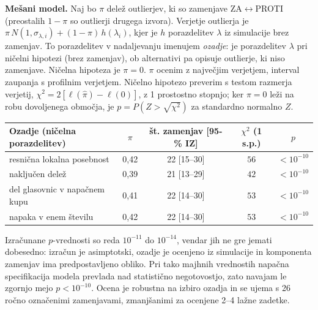 \documentclass[11pt,a4paper]{article}
\begin{document}
\textbf{Mešani model.} Naj bo $\pi$ delež outlierjev, ki so zamenjave ZA$\leftrightarrow$PROTI (preostalih $1-\pi$ so outlierji drugega izvora). Verjetje outlierja je $\pi\,N(1,\sigma_{\lambda,i}) + (1-\pi)\,h(\lambda_i)$, kjer je $h$ porazdelitev $\lambda$ iz simulacije brez zamenjav. To porazdelitev v nadaljevanju imenujem \emph{ozadje}: je porazdelitev $\lambda$ pri ničelni hipotezi (brez zamenjav), ob alternativi pa opisuje outlierje, ki niso zamenjave. Ničelna hipoteza je $\pi=0$. $\pi$ ocenim z največjim verjetjem, interval zaupanja s profilnim verjetjem. Ničelno hipotezo preverim s testom razmerja verjetij, $\chi^2=2[\ell(\hat\pi)-\ell(0)]$, z 1 prostostno stopnjo; ker $\pi=0$ leži na robu dovoljenega območja, je $p=P(Z>\sqrt{\chi^2})$ za standardno normalno $Z$.

\begin{center}
\begin{tabular}{lcccc}
\toprule
Ozadje (ničelna porazdelitev) & $\pi$ & št. zamenjav [95-\% IZ] & $\chi^2$ (1 s.p.) & $p$ \\
\midrule
resnična lokalna posebnost & 0,42 & 22 [15--30] & $56$ & $<10^{-10}$ \\
naključen delež & 0,39 & 21 [13--29] & $42$ & $<10^{-10}$ \\
del glasovnic v napačnem kupu & 0,41 & 22 [14--30] & $53$ & $<10^{-10}$ \\
napaka v enem številu & 0,42 & 22 [14--30] & $53$ & $<10^{-10}$ \\
\bottomrule
\end{tabular}
\end{center}

Izračunane $p$-vrednosti so reda $10^{-11}$ do $10^{-14}$, vendar jih ne gre jemati dobesedno: izračun je asimptotski, ozadje je ocenjeno iz simulacije in komponenta zamenjav ima predpostavljeno obliko. Pri tako majhnih vrednostih napačna specifikacija modela prevlada nad statistično negotovostjo, zato navajam le zgornjo mejo $p<10^{-10}$. Ocena je robustna na izbiro ozadja in se ujema s 26 ročno označenimi zamenjavami, zmanjšanimi za ocenjene 2--4 lažne zadetke.
\end{document}
